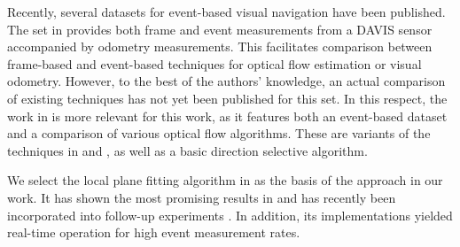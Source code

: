 Recently, several datasets for event-based visual navigation have been published. The set in \citet{Barranco2016} provides both frame and event measurements from a DAVIS sensor accompanied by odometry measurements. This facilitates comparison between frame-based and event-based techniques for optical flow estimation or visual odometry. However, to the best of the authors' knowledge, an actual comparison of existing techniques has not yet been published for this set. In this respect, the work in \citet{Ruckauer2016} is more relevant for this work, as it features both an event-based dataset and a comparison of various optical flow algorithms. These are variants of the techniques in \cite{Benosman2012} and \cite{Benosman2014}, as well as a basic direction selective algorithm.

We select the local plane fitting algorithm in \citet{Benosman2014} as the basis of the approach in our work. It has shown the most promising results in \cite{Ruckauer2016} and has recently been incorporated into follow-up experiments \cite{Clady2014,Clady2015}. In addition, its implementations yielded real-time operation for high event measurement rates.


